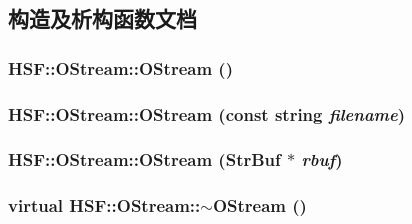 \subsection{构造及析构函数文档}
\hypertarget{classHSF_1_1OStream_aa5114fea384c827743a416287447b840}{
\subsubsection[{OStream}]{\setlength{\rightskip}{0pt plus 5cm}HSF::OStream::OStream ()}}
\label{classHSF_1_1OStream_aa5114fea384c827743a416287447b840}
\hypertarget{classHSF_1_1OStream_aeea5b502867b5796d3442dca543699ae}{
\subsubsection[{OStream}]{\setlength{\rightskip}{0pt plus 5cm}HSF::OStream::OStream (const string {\em filename})}}
\label{classHSF_1_1OStream_aeea5b502867b5796d3442dca543699ae}
\hypertarget{classHSF_1_1OStream_aa9dec59af482b209a4a4d89cd6ff99e5}{
\subsubsection[{OStream}]{\setlength{\rightskip}{0pt plus 5cm}HSF::OStream::OStream ({\bf StrBuf} $\ast$ {\em rbuf})}}
\label{classHSF_1_1OStream_aa9dec59af482b209a4a4d89cd6ff99e5}
\hypertarget{classHSF_1_1OStream_ad18f77a28e352d3e23f53eb67e7fd6fd}{
\subsubsection[{$\sim$OStream}]{\setlength{\rightskip}{0pt plus 5cm}virtual HSF::OStream::$\sim$OStream ()}}
\label{classHSF_1_1OStream_ad18f77a28e352d3e23f53eb67e7fd6fd}
